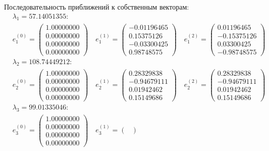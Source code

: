\documentclass[12pt, a4paper]{article}
\begin{document}
	Последовательность приближений к собственным векторам:
	\begin{eqnarray*}
		& \lambda_1 = 57.14051355:\\
		& e_1^{(0)} = \begin{pmatrix}
			1.00000000 \\ 0.00000000 \\ 0.00000000 \\ 0.00000000
		\end{pmatrix} \quad e_1^{(1)} = \begin{pmatrix}
			-0.01196465 \\ 0.15375126 \\-0.03300425 \\ 0.98748575
		\end{pmatrix} \quad e_1^{(2)} = \begin{pmatrix}
			0.01196465 \\-0.15375126 \\ 0.03300425 \\-0.98748575
		\end{pmatrix} \\
		& \lambda_2 = 108.74449212:\\
		& e_2^{(0)} = \begin{pmatrix}
			1.00000000 \\ 0.00000000 \\ 0.00000000 \\ 0.00000000
		\end{pmatrix} \quad e_2^{(1)} = \begin{pmatrix}
			0.28329838 \\-0.94679111 \\ 0.01942462 \\ 0.15149686
		\end{pmatrix} \quad e_2^{(2)} = \begin{pmatrix}
			0.28329838 \\-0.94679111 \\ 0.01942462 \\ 0.15149686
		\end{pmatrix} \\
		& \lambda_3 = 99.01335046:\\
		& e_3^{(0)} = \begin{pmatrix}
			1.00000000 \\ 0.00000000 \\ 0.00000000 \\ 0.00000000
		\end{pmatrix} \quad e_3^{(1)} = \begin{pmatrix}

\end{pmatrix}
\end{eqnarray*}
\end{document}
